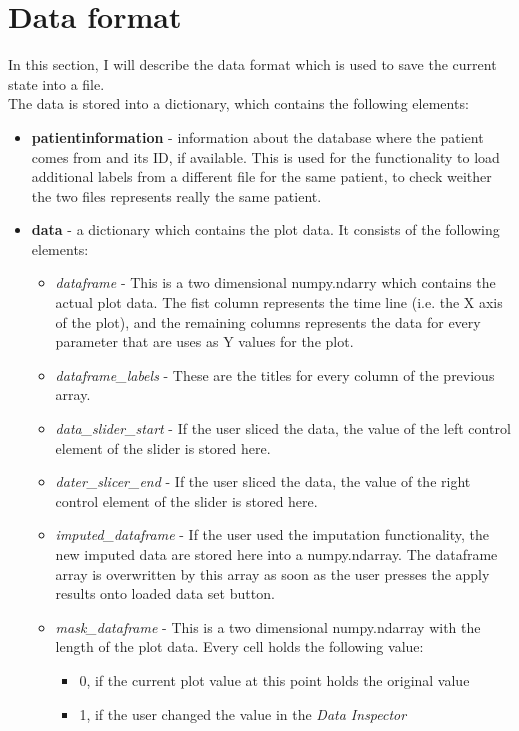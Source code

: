 
\chapter{Data format}
In this section, I will describe the data format which is used to save the current state into a file. 
\\The data is stored into a dictionary, which contains the following elements:
\begin{itemize}
\item \textbf{patientinformation} - information about the database where the patient comes from and its ID, if available. This is used for the functionality to load additional labels from a different file for the same patient, to check weither the two files represents really the same patient. 
\item \textbf{data} - a dictionary which contains the plot data. It consists of the following elements:
\begin{itemize}
\item \textit{dataframe} - This is a two dimensional numpy.ndarry which contains the actual plot data. The fist column represents the time line (i.e. the X axis of the plot), and the remaining columns represents the data for every parameter that are uses as Y values for the plot.
\item \textit{dataframe\_labels} - These are the titles for every column of the previous array. 
\item \textit{data\_slider\_start} - If the user sliced the data, the value of the left control element of the slider is stored here.
\item \textit{dater\_slicer\_end} - If the user sliced the data, the value of the right control element of the slider is stored here.
\item \textit{imputed\_dataframe} - If the user used the imputation functionality, the new imputed data are stored here into a numpy.ndarray. The dataframe array is overwritten by this array as soon as the user presses the \glqq apply results onto loaded data set\grqq{} button.
\item \textit{mask\_dataframe} - This is a two dimensional numpy.ndarray with the length of the plot data. Every cell holds the following value:
\begin{itemize}
\item 0, if the current plot value at this point holds the original value
\item 1, if the user changed the value in the \textit{Data Inspector}

\end{itemize}
\end{itemize}
\end{itemize}
